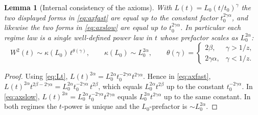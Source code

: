 \documentclass{amsart}
\newtheorem{lemma}{Lemma}
\theoremstyle{definition}
\newcommand{\asymp}{\sim}
\begin{document}
\begin{lemma}[Internal consistency of the axioms]\label{lem:consistent}
With $L(t)=L_0(t/t_0)^{\gamma}$ the two displayed forms in \eqref{eq:axfast} are
equal up to the constant factor $t_0^{2\gamma\alpha}$, and likewise the two forms
in \eqref{eq:axslow} are equal up to $t_0^{2\gamma\alpha}$. In particular each
regime law is a single well-defined power law in $t$ whose prefactor scales as
$L_0^{2\alpha}$:
\[
   W^2(t)\asymp \kappa(L_0)\,t^{\theta(\gamma)},\qquad
   \kappa(L_0)\asymp L_0^{2\alpha},\qquad
   \theta(\gamma)=\begin{cases}2\beta,&\gamma>1/z,\\ 2\gamma\alpha,&\gamma<1/z.\end{cases}
\]
\end{lemma}
\begin{proof}
Using \eqref{eq:Lt}, $L(t)^{2\alpha}=L_0^{2\alpha}t_0^{-2\gamma\alpha}t^{2\gamma\alpha}$.
Hence in \eqref{eq:axfast},
$L(t)^{2\alpha}t^{2\beta-2\gamma\alpha}
=L_0^{2\alpha}t_0^{-2\gamma\alpha}\,t^{2\beta}$,
which equals $L_0^{2\alpha}t^{2\beta}$ up to the constant $t_0^{-2\gamma\alpha}$.
In \eqref{eq:axslow}, $L(t)^{2\alpha}=L_0^{2\alpha}t_0^{-2\gamma\alpha}t^{2\gamma\alpha}$
equals $L_0^{2\alpha}t^{2\gamma\alpha}$ up to the same constant. In both regimes the
$t$-power is unique and the $L_0$-prefactor is $\asymp L_0^{2\alpha}$.
\end{proof}
\end{document}
